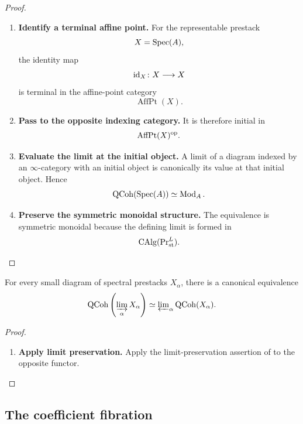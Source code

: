 \begin{proof}
\leavevmode
\begin{enumerate}[label=\textup{(\arabic*)}]
    \item \textbf{Identify a terminal affine point.}
    For the representable prestack
    \[
        X=\operatorname{Spec}(A),
    \]
    the identity map
    \[
        \operatorname{id}_X
        \colon
        X
        \longrightarrow
        X
    \]
    is terminal in the affine-point category
    \[
        \operatorname{AffPt}(X).
    \]

    \item \textbf{Pass to the opposite indexing category.}
    It is therefore initial in
    \[
        \operatorname{AffPt}(X)^{\mathrm{op}}.
    \]

    \item \textbf{Evaluate the limit at the initial object.}
    A limit of a diagram indexed by an $\infty$-category with an initial
    object is canonically its value at that initial object. Hence
    \[
        \operatorname{QCoh}(\operatorname{Spec}(A))
        \simeq
        \operatorname{Mod}_A.
    \]

    \item \textbf{Preserve the symmetric monoidal structure.}
    The equivalence is symmetric monoidal because the defining limit is
    formed in
    \[
        \operatorname{CAlg}(\operatorname{Pr}^L_{\mathrm{st}}).
    \]
\end{enumerate}
\end{proof}

\begin{corollary}
\label{cor:qcoh-colimits-to-limits}
For every small diagram of spectral prestacks $X_\alpha$, there is a
canonical equivalence
\[
    \operatorname{QCoh}
    \left(
        \varinjlim_\alpha X_\alpha
    \right)
    \simeq
    \varprojlim\nolimits_\alpha\operatorname{QCoh}(X_\alpha).
\]
\end{corollary}

\begin{proof}
\leavevmode
\begin{enumerate}[label=\textup{(\arabic*)}]
    \item \textbf{Apply limit preservation.}
    Apply the limit-preservation assertion of
     to the opposite functor.
\end{enumerate}
\end{proof}

\subsection{The coefficient fibration}


